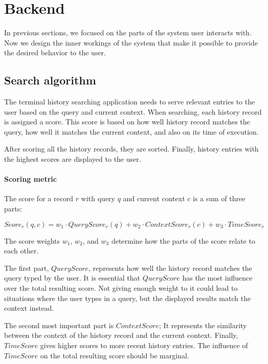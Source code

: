 \section{Backend}

In previous sections, we focused on the parts of the system user interacts with.
Now we design the inner workings of the system that make it possible to provide the desired behavior to the user.

\subsection{Search algorithm}

The terminal history searching application needs to serve relevant entries to the user based on the query and current context. When searching, each history record is assigned a score. This score is based on how well history record matches the query, how well it matches the current context, and also on its time of execution. 

After scoring all the history records, they are sorted. Finally, history entries with the highest scores are displayed to the user.

\paragraph{Scoring metric}

The score for a record \(r\) with query \(q\) and current context \(c\) is a sum of three parts: 

\[ Score_r(q,c) = w_1 \cdot QueryScore_r(q) + w_2 \cdot ContextScore_r(c) + w_3 \cdot TimeScore_r \]

The score weights \(w_1\), \(w_2\), and \(w_3\) determine how the parts of the score relate to each other. 

The first part, \(QueryScore\), represents how well the history record matches the query typed by the user. It is essential that \(QueryScore\) has the most influence over the total resulting score. Not giving enough weight to it could lead to situations where the user types in a query, but the displayed results match the context instead. 

The second most important part is \(ContextScore\); It represents the similarity between the context of the history record and the current context. Finally, \(TimeScore\) gives higher scores to more recent history entries. The influence of \(TimeScore\) on the total resulting score should be marginal.

